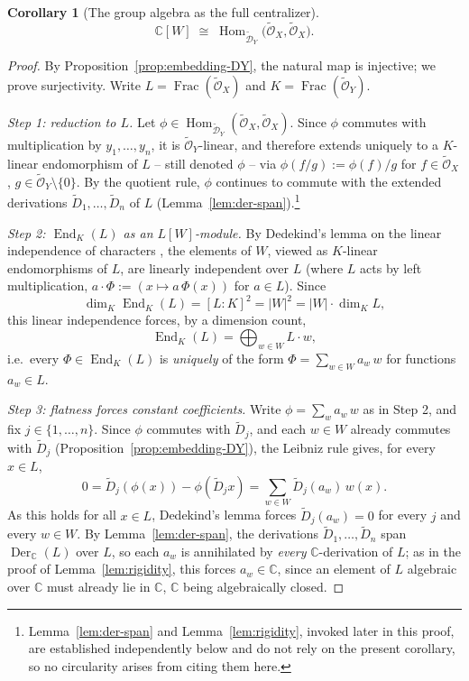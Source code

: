 \documentclass[11pt,a4paper]{article}
\newtheorem{corollary}[theorem]{Corollary}
\begin{document}
\begin{corollary}[The group algebra as the full centralizer]\label{cor:iso-CW}
\[
  \mathbb{C}[W] \;\cong\; \operatorname{Hom}_{\widetilde{\mathcal{D}}_Y}
  \big(\widetilde{\mathcal{O}}_X, \widetilde{\mathcal{O}}_X\big).
\]
\end{corollary}

\begin{proof}
By Proposition~\ref{prop:embedding-DY}, the natural map is injective;
we prove surjectivity. Write $L = \operatorname{Frac}(\widetilde{\mathcal O}_X)$
and $K = \operatorname{Frac}(\widetilde{\mathcal O}_Y)$.

\smallskip\noindent\emph{Step 1: reduction to $L$.} Let
$\phi \in \operatorname{Hom}_{\widetilde{\mathcal D}_Y}(\widetilde{\mathcal O}_X,\widetilde{\mathcal O}_X)$.
Since $\phi$ commutes with multiplication by $y_1,\dots,y_n$, it is
$\widetilde{\mathcal O}_Y$-linear, and therefore extends uniquely to a
$K$-linear endomorphism of $L$ -- still denoted $\phi$ -- via
$\phi(f/g) := \phi(f)/g$ for $f \in \widetilde{\mathcal O}_X$,
$g \in \widetilde{\mathcal O}_Y \setminus \{0\}$. By the quotient rule,
$\phi$ continues to commute with the extended derivations
$\widetilde D_1,\dots,\widetilde D_n$ of $L$
(Lemma~\ref{lem:der-span}).\footnote{Lemma~\ref{lem:der-span} and
Lemma~\ref{lem:rigidity}, invoked later in this proof, are established
independently below and do not rely on the present corollary, so no
circularity arises from citing them here.}

\smallskip\noindent\emph{Step 2: $\operatorname{End}_K(L)$ as an
$L[W]$-module.} By Dedekind's lemma on the linear independence of
characters \cite[Chap.\ VI]{Lang2002}, the elements of $W$, viewed as
$K$-linear endomorphisms of $L$, are linearly independent over $L$
(where $L$ acts by left multiplication,
$a \cdot \Phi := (x \mapsto a\,\Phi(x))$ for $a \in L$). Since
\[
  \dim_K \operatorname{End}_K(L) = [L:K]^2 = |W|^2 = |W| \cdot \dim_K L,
\]
this linear independence forces, by a dimension count,
\[
  \operatorname{End}_K(L) = \bigoplus_{w \in W} L \cdot w,
\]
i.e.\ every $\Phi \in \operatorname{End}_K(L)$ is \emph{uniquely} of
the form $\Phi = \sum_{w \in W} a_w\, w$ for functions $a_w \in L$.

\smallskip\noindent\emph{Step 3: flatness forces constant
coefficients.} Write $\phi = \sum_w a_w\, w$ as in Step 2, and fix
$j \in \{1,\dots,n\}$. Since $\phi$ commutes with $\widetilde D_j$,
and each $w \in W$ already commutes with $\widetilde D_j$
(Proposition~\ref{prop:embedding-DY}), the Leibniz rule gives, for
every $x \in L$,
\[
  0 = \widetilde D_j(\phi(x)) - \phi(\widetilde D_j x)
    = \sum_{w \in W} \widetilde D_j(a_w)\, w(x).
\]
As this holds for all $x \in L$, Dedekind's lemma forces
$\widetilde D_j(a_w) = 0$ for every $j$ and every $w \in W$. By
Lemma~\ref{lem:der-span}, the derivations
$\widetilde D_1,\dots,\widetilde D_n$ span $\operatorname{Der}_{\mathbb{C}}(L)$
over $L$, so each $a_w$ is annihilated by \emph{every}
$\mathbb{C}$-derivation of $L$; as in the proof of
Lemma~\ref{lem:rigidity}, this forces $a_w \in \mathbb{C}$, since an
element of $L$ algebraic over $\mathbb{C}$ must already lie in
$\mathbb{C}$, $\mathbb{C}$ being algebraically closed.


\end{proof}
\end{document}

